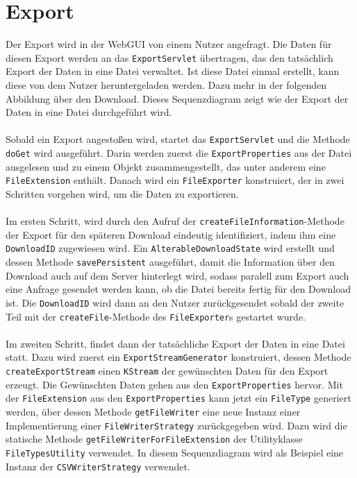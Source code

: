 {{{{{\section{Export}
Der Export wird in der WebGUI von einem Nutzer angefragt. Die Daten für diesen Export werden an das \texttt{ExportServlet} übertragen, das den tatsächlich Export der Daten in eine Datei verwaltet. Ist diese Datei einmal erstellt, kann diese von dem Nutzer heruntergeladen werden. Dazu mehr in der folgenden Abbildung über den Download. Dieses Sequenzdiagram zeigt wie der Export der Daten in eine Datei durchgeführt wird.\\\\
Sobald ein Export angestoßen wird, startet das \texttt{ExportServlet} und die Methode \texttt{doGet} wird ausgeführt. Darin werden zuerst die \texttt{ExportProperties} aus der Datei ausgelesen und zu einem Objekt zusammengestellt, das unter anderem eine \texttt{FileExtension} enthält. Danach wird ein \texttt{FileExporter} konstruiert, der in zwei Schritten vorgehen wird, um die Daten zu exportieren.\\\\
Im ersten Schritt, wird durch den Aufruf der \texttt{createFileInformation}-Methode der Export für den späteren Download eindeutig identifiziert, indem ihm eine \texttt{DownloadID} zugewiesen wird. Ein \texttt{AlterableDownloadState} wird erstellt und dessen Methode \texttt{savePersistent} ausgeführt, damit die Information über den Download auch auf dem Server hinterlegt wird, sodass paralell zum Export auch eine Anfrage gesendet werden kann, ob die Datei bereits fertig für den Download ist. Die \texttt{DownloadID} wird dann an den Nutzer zurückgesendet sobald der zweite Teil mit der \texttt{createFile}-Methode des \texttt{FileExporter}s gestartet wurde.\\\\
Im zweiten Schritt, findet dann der tatsächliche Export der Daten in eine Datei statt. Dazu wird zuerst ein \texttt{ExportStreamGenerator} konstruiert, dessen Methode \texttt{createExportStream} einen \texttt{KStream} der gewünschten Daten für den Export erzeugt. Die Gewünschten Daten gehen aus den \texttt{ExportProperties} hervor. Mit der \texttt{FileExtension} aus den \texttt{ExportProperties} kann jetzt ein \texttt{FileType} generiert werden, über dessen Methode \texttt{getFileWriter} eine neue Instanz einer Implementierung einer \texttt{FileWriterStrategy} zurückgegeben wird. Dazu wird die statische Methode \texttt{getFileWriterForFileExtension} der Utilityklasse \texttt{FileTypesUtility} verwendet. In diesem Sequenzdiagram wird als Beispiel eine Instanz der \texttt{CSVWriterStrategy} verwendet.\\\\
}}}}}
